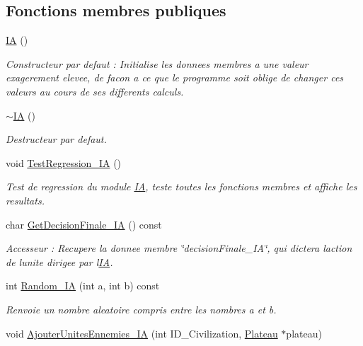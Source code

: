 \subsection*{Fonctions membres publiques}
\begin{DoxyCompactItemize}
\item 
\hyperlink{classIA_a1105717ffef00df8cb87b2c3a5cb2332}{IA} ()
\begin{DoxyCompactList}\small\item\em Constructeur par defaut \+: Initialise les donnees membres a une valeur exagerement elevee, de facon a ce que le programme soit oblige de changer ces valeurs au cours de ses differents calculs. \end{DoxyCompactList}\item 
\hyperlink{classIA_a67d4dd285ae5169239348432bab9ad0e}{$\sim$\+IA} ()
\begin{DoxyCompactList}\small\item\em Destructeur par defaut. \end{DoxyCompactList}\item 
void \hyperlink{classIA_ab5b3e7808c172f2004f3f15c720afed5}{Test\+Regression\+\_\+\+IA} ()
\begin{DoxyCompactList}\small\item\em Test de regression du module \hyperlink{classIA}{IA}, teste toutes les fonctions membres et affiche les resultats. \end{DoxyCompactList}\item 
char \hyperlink{classIA_a65aa469e9145b022750da7f859a336d0}{Get\+Decision\+Finale\+\_\+\+IA} () const
\begin{DoxyCompactList}\small\item\em Accesseur \+: Recupere la donnee membre \char`\"{}decision\+Finale\+\_\+\+I\+A\char`\"{}, qui dictera l\textquotesingle{}action de l\textquotesingle{}unite dirigee par l\textquotesingle{}\hyperlink{classIA}{IA}. \end{DoxyCompactList}\item 
int \hyperlink{classIA_a7e9db872f7a4ff8bf955fa46be231bad}{Random\+\_\+\+IA} (int a, int b) const
\begin{DoxyCompactList}\small\item\em Renvoie un nombre aleatoire compris entre les nombres a et b. \end{DoxyCompactList}\item 
void \hyperlink{classIA_a7a6d457ddad0c9a14cc18dbe72c5eed8}{Ajouter\+Unites\+Ennemies\+\_\+\+IA} (int I\+D\+\_\+\+Civilization, \hyperlink{classPlateau}{Plateau} $\ast$plateau)

\end{DoxyCompactItemize}
